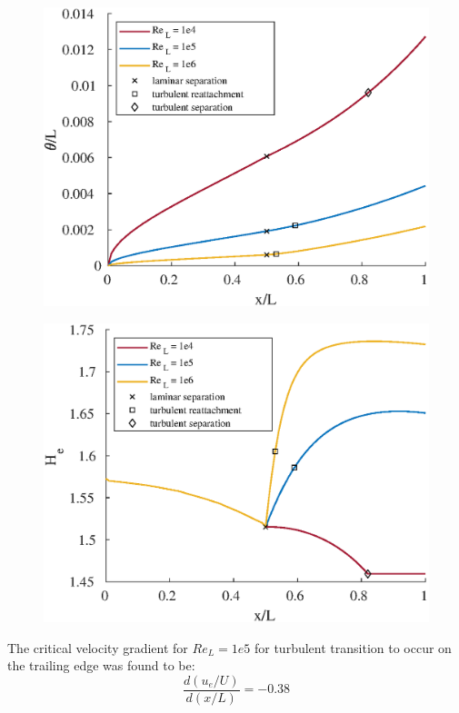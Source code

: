 \begin{figure}[H]
\centering
\includegraphics[scale=0.8]{graphs/e6g3.eps}
\caption{}
\label{e6g3}
\end{figure}

\begin{figure}[H]
\centering
\includegraphics[scale=0.8]{graphs/e6g4.eps}
\caption{}
\label{e6g4}
\end{figure}


  
  The critical velocity gradient for $Re_L = 1e5$ for turbulent transition to occur on the trailing edge was found to be:
  \[\frac{d(u_e/U)}{d(x/L)} = -0.38\]
